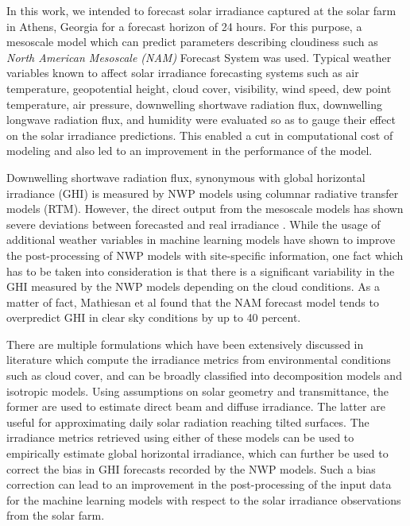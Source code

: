 \par In this work, we intended to forecast solar irradiance captured at the solar farm in Athens, Georgia for a forecast horizon of 24 hours. For this purpose, a mesoscale model which can predict parameters describing cloudiness such as \textit{North American Mesoscale (NAM)} Forecast System \cite{multimodel_nam} was used. Typical weather variables known to affect solar irradiance forecasting systems such as air temperature, geopotential height, cloud cover, visibility, wind speed, dew point temperature, air pressure, downwelling shortwave radiation flux, downwelling longwave radiation flux, and humidity were evaluated so as to gauge their effect on the solar irradiance predictions. This enabled a cut in computational cost of modeling and also led to an improvement in the performance of the model.

\par Downwelling shortwave radiation flux, synonymous with global horizontal irradiance (GHI) is measured by NWP models using columnar radiative transfer models (RTM). However, the direct output from the mesoscale models has shown severe deviations between forecasted and real irradiance \cite{multimodel_ghi}. While the usage of additional weather variables in machine learning models have shown to improve the post-processing of NWP models with site-specific information, one fact which has to be taken into consideration is that there is a significant variability in the GHI measured by the NWP models depending on the cloud conditions. As a matter of fact, Mathiesan et al \cite{multimodel_overpredict} found that the NAM forecast model tends to overpredict GHI in clear sky conditions by up to 40 percent.

\par There are multiple formulations which have been extensively discussed in literature which compute the irradiance metrics from environmental conditions such as cloud cover, and can be broadly classified into decomposition models and isotropic models. Using assumptions on solar geometry and transmittance, the former are used to estimate direct beam and diffuse irradiance. The latter are useful for approximating daily solar radiation reaching tilted surfaces. The irradiance metrics retrieved using either of these models can be used to empirically estimate global horizontal irradiance, which can further be used to correct the bias in GHI forecasts recorded by the NWP models. Such a bias correction can lead to an improvement in the post-processing of the input data for the machine learning models with respect to the solar irradiance observations from the solar farm.

